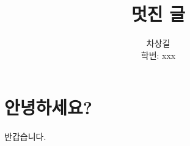 \documentclass[12pt,a4paper]{article}
\title{\vspace{1.9cm}\LARGE{\textbf{멋진 글}}}
\author{차상길\\학번: xxx}
\date{}
\begin{document}
\maketitle

\section{안녕하세요?}

반갑습니다.
\end{document}
